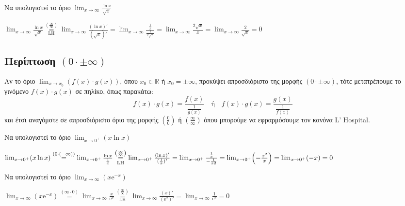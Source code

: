 \begin{example}
  Να υπολογιστεί το όριο $ \lim_{x \to \infty} \frac{\ln{x}}{\sqrt{x}} $
\end{example}
\begin{solution}
  $ \lim_{x \to \infty} \frac{\ln{x}}{\sqrt{x}}
  \overset{\left(\frac{\infty}{\infty}\right)}{\underset{\mathrm{LH}}{=}} 
  \lim_{x \to \infty} \frac{(\ln{x} )'}{(\sqrt{x} )'} = \lim_{x \to \infty}
  \frac{\frac{1}{x}}{\frac{1}{2 \sqrt{x}}} = \lim_{x \to \infty} 
  \frac{2 \sqrt{x} }{x} = \lim_{x \to \infty} \frac{2}{\sqrt{x}} = 0
  $
\end{solution}


\subsection*{Περίπτωση $ (0 \cdot \pm \infty) $}

Αν το όριο $ \lim_{x \to x_{0}} \left(f(x)\cdot g(x)\right) $, όπου $ x_{0} \in
\mathbb{R} $ ή $ x_{0}= \pm \infty $, προκύψει απροσδιόριστο της μορφής $ (0 \cdot \pm
\infty) $, τότε μετατρέπουμε το γινόμενο $ f(x) \cdot g(x) $ σε πηλίκο, όπως παρακάτω:
\[
  f(x)\cdot g(x) = \frac{f(x)}{\frac{1}{g(x)}} \quad \text{ή} \quad
  f(x) \cdot g(x) = \frac{g(x)}{\frac{1}{f(x)}}  
\] 
και έτσι αναγόμστε σε απροσδιόριστο όριο της μορφής $ (\frac{0}{0}) $ ή $
(\frac{\infty}{\infty}) $ όπου μπορούμε να εφραρμόσουμε τον κανόνα L' Hospital.

\begin{example}
  Να υπολογιστεί το όριο $ \lim_{x \to 0^{+}} (x \ln{x}) $
\end{example}
\begin{solution}
  $ \lim_{x \to 0^{+}} (x \ln{x}) \overset{(0 \cdot (-\infty))}{=} \lim_{x \to 0^{+}}
  \frac{\ln{x}}{\frac{1}{x}}
  \overset{\left(\frac{\infty}{\infty}\right)}{\underset{\mathrm{LH}}{=}} 
  \lim_{x \to 0^{+}} \frac{(\ln{x} )'}{(\frac{1}{x} )'} = \lim_{x \to 0^{+}}
  \frac{\frac{1}{x}}{- \frac{1}{x{2}}} = \lim_{x \to 0^{+}} \Bigl(-\frac{x^{2}}{x}\Bigr) 
  = \lim_{x \to 0^{+}} (-x) = 0 $
\end{solution}

\begin{example}
  Να υπολογιστεί το όριο $ \lim_{x \to \infty} (x \mathrm{e}^{-x}) $
\end{example}
\begin{solution}
  $ \lim_{x \to \infty} (x \mathrm{e}^{-x} ) \overset{(\infty\cdot 0)}{=} \lim_{x \to
  \infty} \frac{x}{\mathrm{e}^{x}}
  \overset{\left(\frac{\infty}{\infty}\right)}{\underset{\mathrm{LH}}{=}} 
  \lim_{x \to \infty} \frac{(x)'}{(\mathrm{e}^{x} )'} = \lim_{x \to \infty}
  \frac{1}{\mathrm{e}^{x}} = 0 $
\end{solution}


